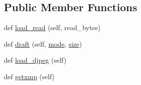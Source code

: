 \subsection*{Public Member Functions}
\begin{DoxyCompactItemize}
\item 
def \hyperlink{classPIL_1_1JpegImagePlugin_1_1JpegImageFile_adf274a543acdd38d6a9cb8accb64c9a3}{load\+\_\+read} (self, read\+\_\+bytes)
\item 
def \hyperlink{classPIL_1_1JpegImagePlugin_1_1JpegImageFile_a0b87cfc5e2fc0f152a0fec40c326f560}{draft} (self, \hyperlink{classPIL_1_1JpegImagePlugin_1_1JpegImageFile_ac7dd31a8f7e9484358372ded5a42477a}{mode}, \hyperlink{classPIL_1_1Image_1_1Image_ae9939a80d0ea9392d8db8556353b2585}{size})
\item 
def \hyperlink{classPIL_1_1JpegImagePlugin_1_1JpegImageFile_afd1b1d89878a5caf762ff2afca947181}{load\+\_\+djpeg} (self)
\item 
def \hyperlink{classPIL_1_1JpegImagePlugin_1_1JpegImageFile_a23c7882f2b066ce8852ed334e9c4890e}{getxmp} (self)
\end{DoxyCompactItemize}

